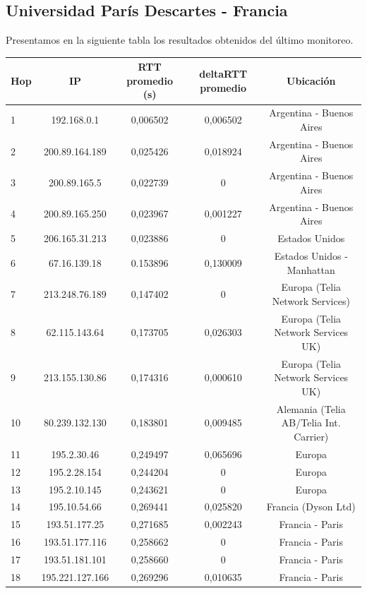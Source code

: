\subsection{Universidad París Descartes - Francia}
Presentamos en la siguiente tabla los resultados obtenidos del último monitoreo.

\bigskip

\begin{tabular}{ | l | c | c | c | c |}
 \hline                 
   Hop & IP &  RTT promedio (s)  & deltaRTT promedio & Ubicación\\
 \hline 
   1 & 192.168.0.1 & 0,006502 & 0,006502 & Argentina - Buenos Aires\\ 
 \hline 
   2 & 200.89.164.189 & 0,025426 & 0,018924 & Argentina - Buenos Aires\\ 
  \hline 
   3 & 200.89.165.5 & 0,022739 & 0 & Argentina - Buenos Aires\\ 
  \hline 
   4 & 200.89.165.250 & 0,023967 & 0,001227 & Argentina - Buenos Aires\\ 
  \hline 
   5 & 206.165.31.213 & 0,023886 & 0 & Estados Unidos\\ 
  \hline 
   6 & 67.16.139.18 & 0.153896 & 0,130009 & Estados Unidos - Manhattan\\ 
  \hline 
   7 & 213.248.76.189 & 0,147402 & 0 & Europa (Telia Network Services)\\ 
  \hline 
   8 & 62.115.143.64 & 0,173705 & 0,026303 & Europa (Telia Network Services UK)\\ 
  \hline 
   9 & 213.155.130.86 & 0,174316 & 0,000610 & Europa (Telia Network Services UK)\\ 
  \hline 
   10 & 80.239.132.130 & 0,183801 & 0,009485 & Alemania (Telia AB/Telia Int. Carrier)\\ 
  \hline 
   11 & 195.2.30.46 & 0,249497 & 0,065696 & Europa\\ 
  \hline 
   12 & 195.2.28.154 & 0,244204 & 0 & Europa\\ 
  \hline 
   13 & 195.2.10.145 & 0,243621 & 0 & Europa\\ 
  \hline 
   14 & 195.10.54.66 & 0,269441 & 0,025820 & Francia (Dyson Ltd)\\ 
  \hline 
   15 & 193.51.177.25 & 0,271685 & 0,002243 & Francia - Paris\\ 
  \hline 
   16 & 193.51.177.116 & 0,258662 & 0 & Francia - Paris\\ 
  \hline 
   17 & 193.51.181.101 & 0,258660 & 0 & Francia - Paris\\
  \hline 
   18 & 195.221.127.166 & 0,269296 & 0,010635 & Francia - Paris\\

\end{tabular}
